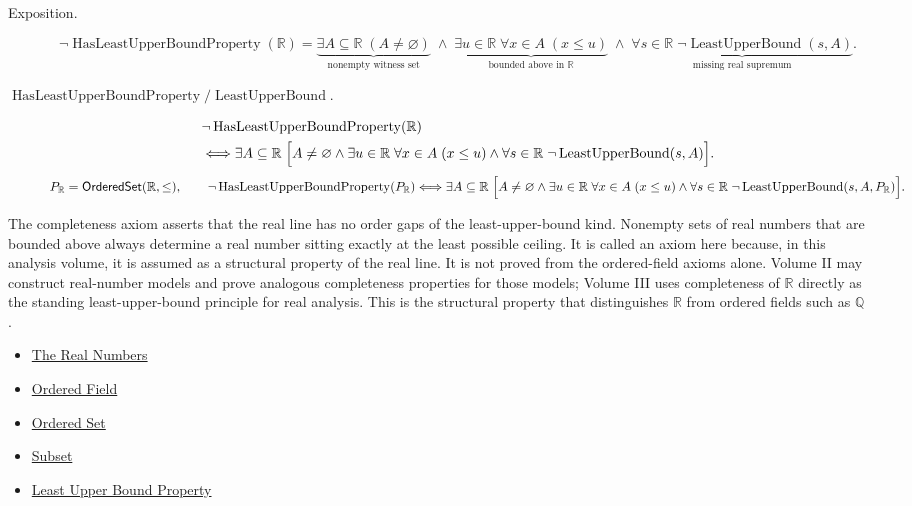 \begin{remark*}
\begin{description}
  \item[Exposition.]
\[
\neg\operatorname{HasLeastUpperBoundProperty}(\mathbb{R})
=
\underbrace{\exists A\subseteq\mathbb{R}\;(A\neq\varnothing)}_{\text{nonempty witness set}}
\;\land\;
\underbrace{\exists u\in\mathbb{R}\;\forall x\in A\;(x\le u)}_{\text{bounded above in }\mathbb{R}}
\;\land\;
\underbrace{\forall s\in\mathbb{R}\;\neg\operatorname{LeastUpperBound}(s,A)}_{\text{missing real supremum}}.
\]


  \item[\(\operatorname{HasLeastUpperBoundProperty} / \operatorname{LeastUpperBound}.\)]
  \[
\begin{aligned}
&\neg\operatorname{HasLeastUpperBoundProperty}(\mathbb{R})\\
&\Longleftrightarrow
\exists A\subseteq\mathbb{R}\;
\Bigl[
A\neq\varnothing
\land
\exists u\in\mathbb{R}\;\forall x\in A\;(x\le u)
\land
\forall s\in\mathbb{R}\;\neg\operatorname{LeastUpperBound}(s,A)
\Bigr].
\end{aligned}
\]
\[
P_{\mathbb{R}}=\mathsf{OrderedSet}(\mathbb{R},\leq),\qquad
\neg\operatorname{HasLeastUpperBoundProperty}(P_{\mathbb{R}})\Longleftrightarrow
\exists A\subseteq\mathbb{R}\;
\Bigl[
A\neq\varnothing
\land
\exists u\in\mathbb{R}\;\forall x\in A\;(x\le u)
\land
\forall s\in\mathbb{R}\;\neg\operatorname{LeastUpperBound}(s,A,P_{\mathbb{R}})
\Bigr].
\]
\end{description}
\end{remark*}

\begin{remark*}[Interpretation]
The completeness axiom asserts that the real line has no order gaps of the
least-upper-bound kind. Nonempty sets of real numbers that are bounded above
always determine a real number sitting exactly at the least possible ceiling.
It is called an axiom here because, in this analysis volume, it is assumed as
a structural property of the real line. It is not proved from the ordered-field
axioms alone. Volume II may construct real-number models and prove analogous
completeness properties for those models; Volume III uses completeness of
$\mathbb{R}$ directly as the standing least-upper-bound principle for real
analysis. This is the structural property that distinguishes $\mathbb{R}$ from
ordered fields such as $\mathbb{Q}$.
\end{remark*}

\begin{dependencies}
\begin{itemize}
  \item \hyperref[def:reals]{The Real Numbers}
  \item \hyperref[def:real-ordered-field]{Ordered Field}
  \item \hyperref[def:ordered-set]{Ordered Set}
  \item \hyperref[def:subset]{Subset}
  \item \hyperref[def:least-upper-bound-property]{Least Upper Bound Property}
\end{itemize}
\end{dependencies}

